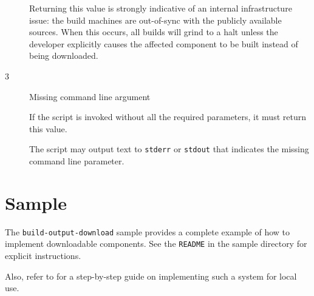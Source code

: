 \begin{description}
  Returning this value is strongly indicative of an internal
  infrastructure issue: the build machines are out-of-sync with the
  publicly available sources.  When this occurs, all builds will grind
  to a halt unless the developer explicitly causes the affected
  component to be built instead of being downloaded.

\item[3]{Missing command line argument}

  If the script is invoked without all the required parameters, it
  must return this value.

  The script may output text to \texttt{stderr} or \texttt{stdout}
  that indicates the missing command line parameter.

\end{description}

\section{Sample}

The \texttt{build-output-download} sample provides a complete example
of how to implement downloadable components.  See the \texttt{README}
in the sample directory for explicit instructions.

Also, refer to  for a step-by-step
guide on implementing such a system for local use.







